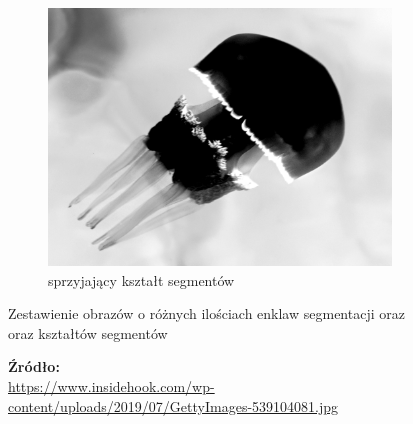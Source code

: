 \documentclass[a4paper, 12pt, polish, twoside]{extreport}
\begin{document}
\begin{figure}[H]
\begin{subfigure}{0.31\textwidth}
        \end{subfigure}
        \begin{subfigure}{0.31\textwidth}
            \centering
            \includegraphics[width = \textwidth]{img/2-theory/20-inv-jellyfish.png}
            \caption{sprzyjający kształt segmentów}
            \label{theory-technics-contrast-jellyfish-c}
        \end{subfigure}
        \caption{Zestawienie obrazów o różnych ilościach enklaw segmentacji oraz oraz kształtów segmentów}
        \caption*{\footnotesize{\textbf{Źródło:}\\
        \url{https://www.insidehook.com/wp-content/uploads/2019/07/GettyImages-539104081.jpg}}}
        \label{theory-technics-contrast-jellyfish}
        \end{figure}
    
\end{document}

